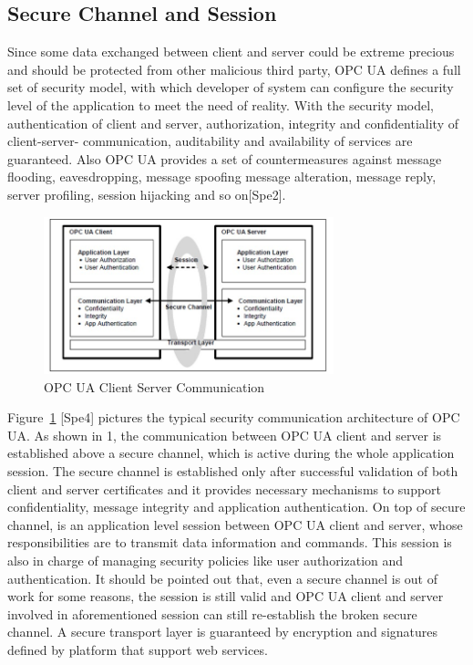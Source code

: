 \documentclass[]{llncs}
\begin{document}
\subsection{Secure Channel and Session}
Since some data exchanged between client and server could be extreme precious and should be protected from other malicious third party, OPC UA defines a full set of security model, with which developer of system can configure the security level of the application to meet the need of reality. With the security model, authentication of client and server, authorization, integrity and confidentiality of client-server- communication, auditability and availability of services are guaranteed. Also OPC UA provides a set of countermeasures against message flooding, eavesdropping, message spoofing message alteration, message reply, server profiling, session hijacking and so on[Spe2].
\begin{figure}
	\centering
	\includegraphics[width=0.75\textwidth]{opc_ua_cs_comm.jpg}
		\caption[ ]{OPC UA Client Server Communication}
	\label{fig:opc_ua_cs_comm}
\end{figure}


Figure~\ref{fig:opc_ua_cs_comm} [Spe4] pictures the typical security communication architecture of OPC UA. As shown in 1, the communication between OPC UA client and server is established above a secure channel, which is active during the whole application session. The secure channel is established only after successful validation of both client and server certificates and it provides necessary mechanisms to support confidentiality, message integrity and application authentication. On top of secure channel, is an application level session between OPC UA client and server, whose responsibilities are to transmit data information and commands. This session is also in charge of managing security policies like user authorization and authentication. It should be pointed out that, even a secure channel is out of work for some reasons, the session is still valid and OPC UA client and server involved in aforementioned session can still re-establish the broken secure channel. A secure transport layer is guaranteed by encryption and signatures defined by platform that support web services.
\end{document}
